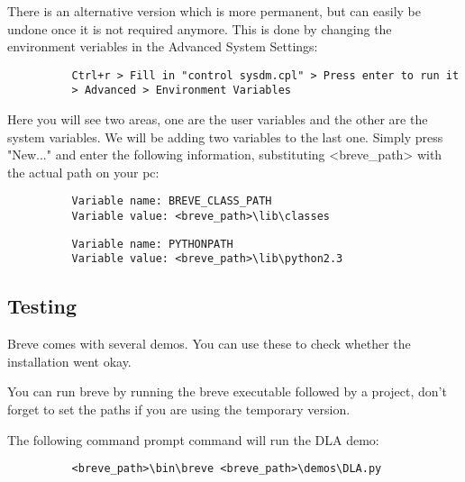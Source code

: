 	There is an alternative version which is more permanent, but can easily be undone once it is not required anymore. This is done by changing the environment veriables in the Advanced System Settings:
	\begin{verbatim}
		  Ctrl+r > Fill in "control sysdm.cpl" > Press enter to run it
		  > Advanced > Environment Variables
	\end{verbatim}

	Here you will see two areas, one are the user variables and the other are the system variables. We will be adding two variables to the last one. Simply press "New..." and enter the following information, substituting <breve\_path> with the actual path on your pc:
	\begin{verbatim}
		  Variable name: BREVE_CLASS_PATH
		  Variable value: <breve_path>\lib\classes
	\end{verbatim}
	\begin{verbatim}
		  Variable name: PYTHONPATH
		  Variable value: <breve_path>\lib\python2.3
	\end{verbatim}

\subsection{Testing}
	Breve comes with several demos. You can use these to check whether the installation went okay. 

	You can run breve by running the breve executable followed by a project, don't forget to set the paths if you are using the temporary version.

	The following command prompt command will run the DLA demo:
	\begin{verbatim}
		  <breve_path>\bin\breve <breve_path>\demos\DLA.py
	\end{verbatim}

